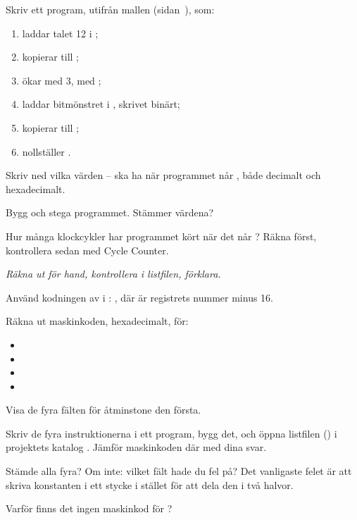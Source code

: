 \label{c7:ex:6}
Skriv ett program, utifrån mallen (sidan~\pageref{lab3:template}), som:
\begin{enumerate}
  \item laddar talet 12 i ;
  \item kopierar  till ;
  \item ökar  med 3, med ;
  \item laddar bitmönstret  i , skrivet binärt;
  \item kopierar  till ;
  \item nollställer .
\end{enumerate}
\begin{parts}
  \item Skriv ned vilka värden -- ska ha när programmet når , både
    decimalt och hexadecimalt.
  \item Bygg och stega programmet. Stämmer värdena?
  \item Hur många klockcykler har programmet kört när det når ? Räkna först, kontrollera
    sedan med Cycle Counter.
\end{parts}

\label{c7:ex:7}
\emph{Räkna ut för hand, kontrollera i listfilen, förklara.}

Använd kodningen av  i : , där  är
registrets nummer minus 16.
\begin{parts}
  \item Räkna ut maskinkoden, hexadecimalt, för:
    \begin{itemize}
      \item {}
      \item {}
      \item {}
      \item {}
    \end{itemize}
    Visa de fyra fälten för åtminstone den första.
  \item Skriv de fyra instruktionerna i ett program, bygg det, och öppna listfilen () i
    projektets katalog . Jämför maskinkoden där med dina svar.
  \item Stämde alla fyra? Om inte: vilket fält hade du fel på? Det vanligaste felet är att skriva
    konstanten i ett stycke i stället för att dela den i två halvor.
  \item Varför finns det ingen maskinkod för ?
\end{parts}

